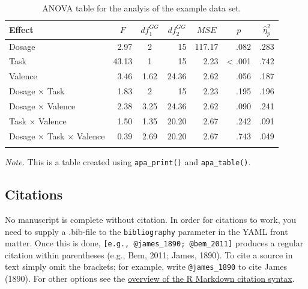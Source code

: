 \documentclass[english,man,floatsintext]{apa6}
\begin{document}
\begin{table}[tbp]

\begin{center}
\begin{threeparttable}

\caption{\label{tab:anova}ANOVA table for the analyis of the example data set.}

\begin{tabular}{lrcrrrl}
\toprule
Effect & \multicolumn{1}{c}{$F$} & \multicolumn{1}{c}{$\mathit{df}_1^{GG}$} & \multicolumn{1}{c}{$\mathit{df}_2^{GG}$} & \multicolumn{1}{c}{$\mathit{MSE}$} & \multicolumn{1}{c}{$p$} & \multicolumn{1}{c}{$\hat{\eta}^2_p$}\\
\midrule
Dosage & 2.97 & 2 & 15 & 117.17 & .082 & .283\\
Task & 43.13 & 1 & 15 & 2.23 & < .001 & .742\\
Valence & 3.46 & 1.62 & 24.36 & 2.62 & .056 & .187\\
Dosage $\times$ Task & 1.83 & 2 & 15 & 2.23 & .195 & .196\\
Dosage $\times$ Valence & 2.38 & 3.25 & 24.36 & 2.62 & .090 & .241\\
Task $\times$ Valence & 1.50 & 1.35 & 20.20 & 2.67 & .242 & .091\\
Dosage $\times$ Task $\times$ Valence & 0.39 & 2.69 & 20.20 & 2.67 & .743 & .049\\
\bottomrule
\addlinespace
\end{tabular}

\begin{tablenotes}[para]
\normalsize{\textit{Note.} This is a table created using \texttt{apa\_print()} and \texttt{apa\_table()}.}
\end{tablenotes}

\end{threeparttable}
\end{center}

\end{table}

\hypertarget{citations}{%
\subsection{Citations}\label{citations}}

No manuscript is complete without citation.
In order for citations to work, you need to supply a .bib-file to the \texttt{bibliography} parameter in the YAML front matter.
Once this is done, \texttt{{[}e.g.,\ @james\_1890;\ @bem\_2011{]}} produces a regular citation within parentheses (e.g., Bem, 2011; James, 1890).
To cite a source in text simply omit the brackets; for example, write \texttt{@james\_1890} to cite James (1890).
For other options see the \href{http://rmarkdown.rstudio.com/authoring_bibliographies_and_citations.html}{overview of the R Markdown citation syntax}.
\end{document}
